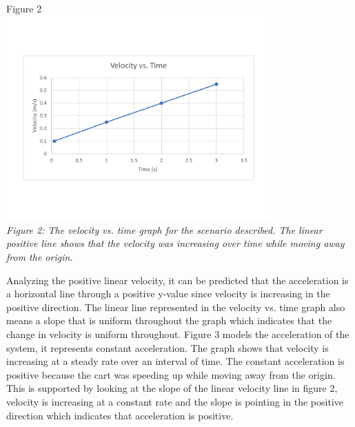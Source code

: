 \documentclass[aps,letterpaper,11pt]{revtex4}
\begin{document}
\begin{center}
Figure 2\\
\vspace{-10mm}
\includegraphics[width=4in]{PartAVeloctiyvsTime.pdf}\\
\vspace{-10mm}
\textit{Figure 2: The velocity vs. time graph for the scenario described. The linear positive line shows that the velocity was increasing over time while moving away from the origin.}
\end{center}
 
Analyzing the positive linear velocity, it can be predicted that the acceleration is a horizontal line through a positive y-value since velocity is increasing in the positive direction. The linear line represented in the velocity vs. time graph also means a slope that is uniform throughout the graph which indicates that the change in velocity is uniform throughout. Figure 3 models the acceleration of the system, it represents constant acceleration. The graph shows that velocity is increasing at a steady rate over an interval of time. The constant acceleration is positive because the cart was speeding up while moving away from the origin. This is supported by looking at the slope of the linear velocity line in figure 2, velocity is increasing at a constant rate and the slope is pointing in the positive direction which indicates that acceleration is positive. 
 
\end{document}
